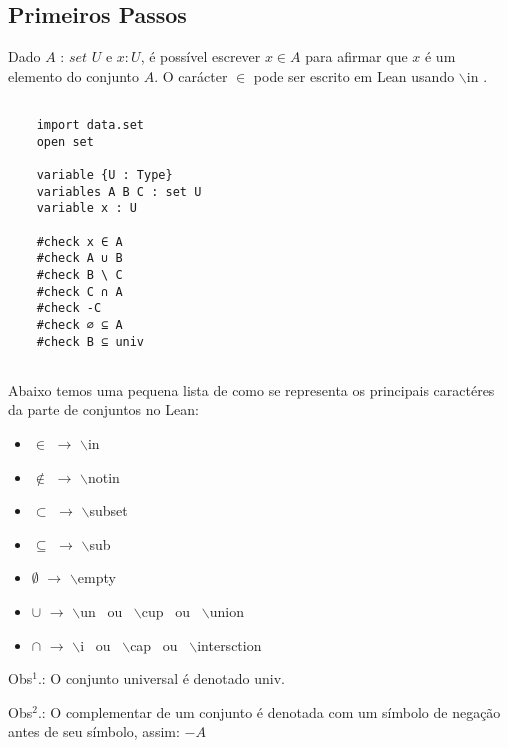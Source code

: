 \subsection{Primeiros Passos}
    Dado $A$ : $set$ $U$ e $x : U$, é possível escrever $x \in A$ para afirmar que $x$ é um elemento do conjunto $A$. O carácter $\in$ pode ser escrito em Lean usando $\backslash$in .
\begin{lstlisting}

    import data.set
    open set

    variable {U : Type}
    variables A B C : set U
    variable x : U

    #check x ∈ A
    #check A ∪ B
    #check B \ C
    #check C ∩ A
    #check -C
    #check ∅ ⊆ A
    #check B ⊆ univ
    
\end{lstlisting}


Abaixo temos uma pequena lista de como se representa os principais caractéres da parte de conjuntos no Lean: 

\begin{itemize}
  
    \item $\in$ $\rightarrow$ $\backslash$in
  
    \item $\notin$ $\rightarrow$ $\backslash$notin
  
    \item $\subset$ $\rightarrow$ $\backslash$subset
  
    \item $\subseteq$ $\rightarrow$ $\backslash$sub
  
    \item $\emptyset$ $\rightarrow$ $\backslash$empty
  
    \item $\cup$ $\rightarrow$ $\backslash$un \ ou \ $\backslash$cup \ ou \ $\backslash$union
  
    \item $\cap$ $\rightarrow$ $\backslash$i \ ou \ $\backslash$cap \ ou \ $\backslash$intersction

\end{itemize}

Obs$^{1}$.: O conjunto universal é denotado {
\selectfont univ}.

Obs$^{2}$.: O complementar de um conjunto é denotada com um símbolo de negação antes de seu símbolo, assim: $-A$

$\qquad$

